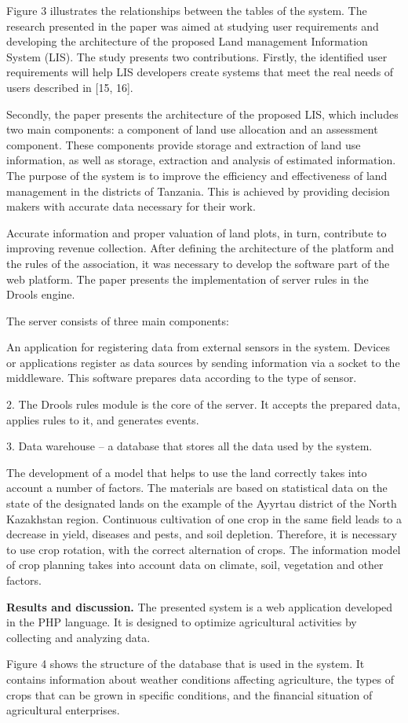 \begin{multicols}{2}
Figure 3 illustrates the relationships between the tables of the system.
The research presented in the paper was aimed at studying user
requirements and developing the architecture of the proposed Land
management Information System (LIS). The study presents two
contributions. Firstly, the identified user requirements will help LIS
developers create systems that meet the real needs of users described in
{[}15, 16{]}.

Secondly, the paper presents the architecture of the proposed LIS, which
includes two main components: a component of land use allocation and an
assessment component. These components provide storage and extraction of
land use information, as well as storage, extraction and analysis of
estimated information. The purpose of the system is to improve the
efficiency and effectiveness of land management in the districts of
Tanzania. This is achieved by providing decision makers with accurate
data necessary for their work.

Accurate information and proper valuation of land plots, in turn,
contribute to improving revenue collection. After defining the
architecture of the platform and the rules of the association, it was
necessary to develop the software part of the web platform. The paper
presents the implementation of server rules in the Drools engine.

The server consists of three main components:

An application for registering data from external sensors in the system.
Devices or applications register as data sources by sending information
via a socket to the middleware. This software prepares data according to
the type of sensor.

2. The Drools rules module is the core of the server. It accepts the
prepared data, applies rules to it, and generates events.

3. Data warehouse -- a database that stores all the data used by the
system.

The development of a model that helps to use the land correctly takes
into account a number of factors. The materials are based on statistical
data on the state of the designated lands on the example of the Ayyrtau
district of the North Kazakhstan region. Continuous cultivation of one
crop in the same field leads to a decrease in yield, diseases and pests,
and soil depletion. Therefore, it is necessary to use crop rotation,
with the correct alternation of crops. The information model of crop
planning takes into account data on climate, soil, vegetation and other
factors.

{\bfseries Results and discussion.} The presented system is a web
application developed in the PHP language. It is designed to optimize
agricultural activities by collecting and analyzing data.

Figure 4 shows the structure of the database that is used in the system.
It contains information about weather conditions affecting agriculture,
the types of crops that can be grown in specific conditions, and the
financial situation of agricultural enterprises.
\end{multicols}

